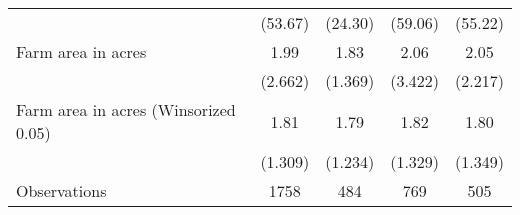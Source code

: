 {\begin{tabular}{l*{4}{c}}
                    &     (53.67)         &     (24.30)         &     (59.06)         &     (55.22)         \\
[1em]
Farm area in acres  &        1.99         &        1.83         &        2.06         &        2.05         \\
                    &     (2.662)         &     (1.369)         &     (3.422)         &     (2.217)         \\
[1em]
Farm area in acres (Winsorized 0.05)&        1.81         &        1.79         &        1.82         &        1.80         \\
                    &     (1.309)         &     (1.234)         &     (1.329)         &     (1.349)         \\
\hline
Observations        &        1758         &         484         &         769         &         505         \\
\hline\hline
\end{tabular}
}
